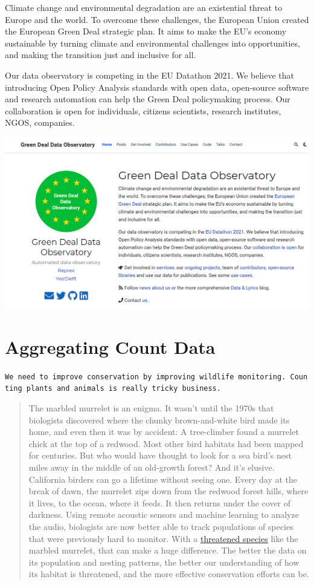\documentclass[
  a4paper,
  openany, a4paper, oneside]{book}
\begin{document}
Climate change and environmental degradation are an existential threat to Europe and the world. To overcome these challenges, the European Union created the European Green Deal strategic plan. It aims to make the EU's economy sustainable by turning climate and environmental challenges into opportunities, and making the transition just and inclusive for all.

Our data observatory is competing in the EU Datathon 2021. We believe that introducing Open Policy Analysis standards with open data, open-source software and research automation can help the Green Deal policymaking process. Our collaboration is open for individuals, citizens scientists, research institutes, NGOS, companies.

\begin{center}\includegraphics[width=0.8\linewidth]{plots/screenshots/green_deal_observatory} \end{center}

\hypertarget{aggregating-count-data}{%
\section{Aggregating Count Data}\label{aggregating-count-data}}

\texttt{We\ need\ to\ improve\ conservation\ by\ improving\ wildlife\ monitoring.\ Counting\ plants\ and\ animals\ is\ really\ tricky\ business.}

\begin{quote}
The marbled murrelet is an enigma. It wasn't until the 1970s that biologists discovered where the chunky brown-and-white bird made its home, and even then it was by accident: A tree-climber found a murrelet chick at the top of a redwood. Most other bird habitats had been mapped for centuries. But who would have thought to look for a sea bird's nest miles away in the middle of an old-growth forest?
And it's elusive. California birders can go a lifetime without seeing one. Every day at the break of dawn, the murrelet zips down from the redwood forest hills, where it lives, to the ocean, where it feeds. It then returns under the cover of darkness.
Using remote acoustic sensors and machine learning to analyze the audio, biologists are now better able to track populations of species that were previously hard to monitor. With a \href{https://www.fws.gov/arcata/es/birds/MM/m_murrelet.html}{threatened species} like the marbled murrelet, that can make a huge difference. The better the data on its population and nesting patterns, the better our understanding of how its habitat is threatened, and the more effective conservation efforts can be.
\end{quote}
\end{document}
